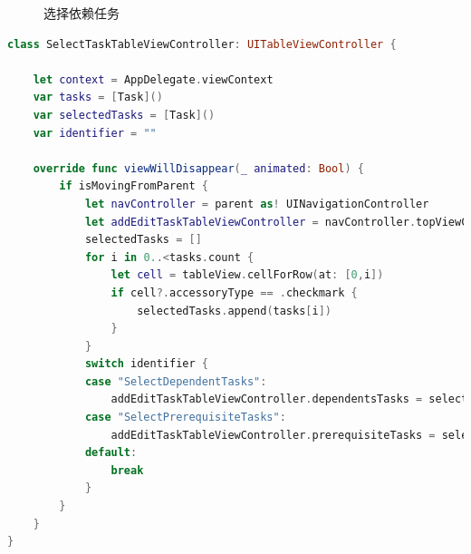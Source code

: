\begin{figure}[!hbp]
	\centering
	\caption{选择依赖任务}
	\label{fig:select_prerequisites_tasks}
\end{figure}

\begin{lstlisting}[language={Swift}, caption={选择任务界面的代码}]
class SelectTaskTableViewController: UITableViewController {

    let context = AppDelegate.viewContext
    var tasks = [Task]()
    var selectedTasks = [Task]()
    var identifier = ""
    
    override func viewWillDisappear(_ animated: Bool) {
        if isMovingFromParent {
            let navController = parent as! UINavigationController
            let addEditTaskTableViewController = navController.topViewController as! AddEditTaskTableViewController
            selectedTasks = []
            for i in 0..<tasks.count {
                let cell = tableView.cellForRow(at: [0,i])
                if cell?.accessoryType == .checkmark {
                    selectedTasks.append(tasks[i])
                }
            }
            switch identifier {
            case "SelectDependentTasks":
                addEditTaskTableViewController.dependentsTasks = selectedTasks
            case "SelectPrerequisiteTasks":
                addEditTaskTableViewController.prerequisiteTasks = selectedTasks
            default:
                break
            }
        }
    }
}
\end{lstlisting}

